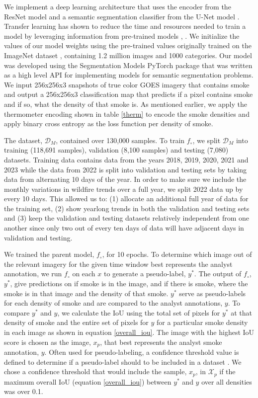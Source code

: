 \documentclass{article}
\begin{document}
We implement a deep learning architecture that uses the encoder from the ResNet model \cite{resnet} and a semantic segmentation classifier from the U-Net model \cite{unet}. Transfer learning has shown to reduce the time and resources needed to train a model by leveraging information from pre-trained models \cite{transfer}, \cite{transfer2}. We initialize the values of our model weights using the pre-trained values originally trained on the ImageNet dataset \cite{imgnet}, containing 1.2 million images and 1000 categories. Our model was developed using the Segmentation Models PyTorch package \cite{semantic} that was written as a high level API for implementing models for semantic segmentation problems. We input 256x256x3 snapshots of true color GOES imagery that contains smoke and output a 256x256x3 classification map that predicts if a pixel contains smoke and if so, what the density of that smoke is. As mentioned earlier, we apply the thermometer encoding shown in table \ref{therm} to encode the smoke densities and apply binary cross entropy as the loss function per density of smoke. 

The dataset, \(\mathcal{D}_M\), contained over 130,000 samples. To train \(f_{\circ}\), we split \(\mathcal{D}_M\) into training (118,691 samples), validation (8,100 samples) and testing (7,080) datasets. Training data contains data from the years 2018, 2019, 2020, 2021 and 2023 while the data from 2022 is split into validation and testing sets by taking data from alternating 10 days of the year. In order to make sure we include the monthly variations in wildfire trends over a full year, we split 2022 data up by every 10 days. This allowed us to: (1) allocate an additional full year of data for the training set, (2) show yearlong trends in both the validation and testing sets and (3) keep the validation and testing datasets relatively independent from one another since only two out of every ten days of data will have adjacent days in validation and testing.


We trained the parent model, \(f_{\circ}\), for 10 epochs. To determine which image out of the relevant imagery for the given time window best represents the analyst annotation, we run \(f_{\circ}\) on each \(x\) to generate a pseudo-label, \(y^*\). The output of \(f_{\circ}\), \(y^*\), give predictions on if smoke is in the image, and if there is smoke, where the smoke is in that image and the density of that smoke. \(y^*\) serve as pseudo-labels for each density of smoke and are compared to the analyst annotations, \(y\). To compare \(y^*\) and \(y\), we calculate the IoU using the total set of pixels for \(y^*\) at that density of smoke and the entire set of pixels for \(y\) for a particular smoke density in each image as shown in equation \ref{overall_iou}. The image with the highest IoU score is chosen as the image, \(x_p\), that best represents the analyst smoke annotation, \(y\). Often used for pseudo-labeling, a confidence threshold value is defined to determine if a pseudo-label should to be included in a dataset \cite{conf_thresh}. We chose a confidence threshold that would include the sample, \(x_p\), in \(\mathcal{X}_{p}\) if the maximum overall IoU (equation \ref{overall_iou}) between \(y^*\) and \(y\) over all densities was over 0.1. 
\end{document}
